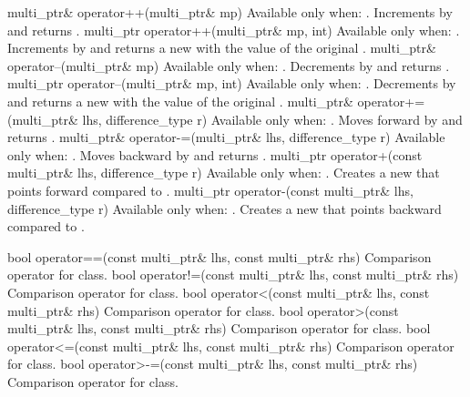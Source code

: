 \addRow
{multi_ptr\& operator++(multi_ptr\& mp)}
{Available only when: .
\newline
Increments  by  and returns  .}
\addRow
{multi_ptr operator++(multi_ptr\& mp, int)}
{Available only when: .
\newline
Increments  by  and returns a new 
with the value of the original .}
\addRow
{multi_ptr\& operator--(multi_ptr\& mp)}
{Available only when: .
\newline
Decrements  by  and returns .}
\addRow
{multi_ptr operator--(multi_ptr\& mp, int)}
{Available only when: .
\newline
Decrements  by  and returns a new 
with the value of the original .}
\addRow
{multi_ptr\& operator+=(multi_ptr\& lhs, difference_type r)}
{Available only when: .
\newline
Moves  forward by  and returns  .}
\addRow
{multi_ptr\& operator-=(multi_ptr\& lhs, difference_type r)}
{Available only when: .
\newline
Moves  backward by  and returns  .}
\addRow
{multi_ptr operator+(const multi_ptr\& lhs, difference_type r)}
{Available only when: .
\newline
Creates a new  that points  forward
compared to .}
\addRow
{multi_ptr operator-(const multi_ptr\& lhs, difference_type r)}
{Available only when: .
\newline
Creates a new  that points  backward
compared to .}

\addRow
{bool operator==(const multi_ptr\& lhs, const multi_ptr\& rhs)}
{Comparison operator \codeinline{==} for  class.}
\addRow
{bool operator!=(const multi_ptr\& lhs, const multi_ptr\& rhs)}
{Comparison operator \codeinline{!=} for  class.}
\addRow
{bool operator<(const multi_ptr\& lhs, const multi_ptr\& rhs)}
{Comparison operator \codeinline{<} for  class.}
\addRow
{bool operator>(const multi_ptr\& lhs, const multi_ptr\& rhs)}
{Comparison operator \codeinline{>} for  class.}
\addRow
{bool operator<=(const multi_ptr\& lhs, const multi_ptr\& rhs)}
{Comparison operator \codeinline{<=} for  class.}
\addRow
{bool operator>-=(const multi_ptr\& lhs, const multi_ptr\& rhs)}
{Comparison operator \codeinline{>=} for  class.}

